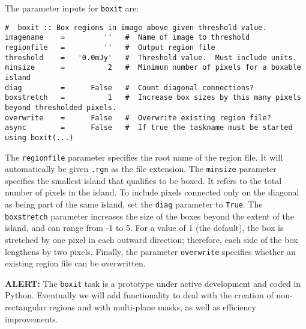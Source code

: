 The parameter inputs for {\tt boxit} are:
\small
\begin{verbatim}
#  boxit :: Box regions in image above given threshold value.
imagename    =         ''   #  Name of image to threshold
regionfile   =         ''   #  Output region file
threshold    =   '0.0mJy'   #  Threshold value.  Must include units.
minsize      =          2   #  Minimum number of pixels for a boxable island
diag         =      False   #  Count diagonal connections?
boxstretch   =          1   #  Increase box sizes by this many pixels beyond thresholded pixels.
overwrite    =      False   #  Overwrite existing region file?
async        =      False   #  If true the taskname must be started using boxit(...)
\end{verbatim}
\normalsize 

The {\tt regionfile} parameter specifies the root name of the region file.  It
will automatically be given {\tt .rgn} as the file extension.  
The {\tt minsize} parameter specifies the smallest island that qualifies to be
boxed.  It refers to the total number of pixels in the island. 
To include pixels connected only on the diagonal as being part of the same
island, set the {\tt diag} parameter to {\tt True}.  The {\tt boxstretch}
parameter increases the size of the boxes beyond the extent of the island, and
can range from -1 to 5.  For a value of 1 (the default), the
box is stretched by one pixel in each outward direction; therefore, each side
of the box lengthens by two pixels.  Finally, the parameter {\tt overwrite}
specifies whether an existing region file can be overwritten.

{\bf ALERT:} The {\tt boxit} task is a prototype under active development and
coded in Python. Eventually we will add functionality to deal with the creation of
non-rectangular regions and with multi-plane masks, as well as efficiency
improvements.  %

